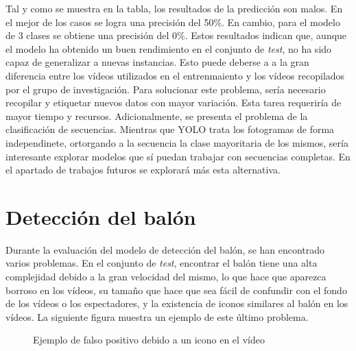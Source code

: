 \documentclass[12pt]{report} %
\begin{document}
    Tal y como se muestra en la tabla, los resultados de la predicción son
    malos. En el mejor de los casos se logra una precisión del 50\%. En cambio,
    para el modelo de 3 clases se obtiene una precisión del 0\%. Estos
    resultados indican que, aunque el modelo ha obtenido un buen rendimiento en
    el conjunto de \textit{test}, no ha sido capaz de generalizar a nuevas
    instancias. Esto puede deberse a a la gran diferencia entre los vídeos
    utilizados en el entrenmaiento y los vídeos recopilados por el grupo de
    investigación. Para solucionar este problema, sería necesario recopilar y
    etiquetar nuevos datos con mayor variación. Esta tarea requeriría de mayor
    tiempo y recursos. Adicionalmente, se presenta el problema de la
    clasificación de secuencias. Mientras que YOLO trata los fotogramas de
    forma independinete, ortorgando a la secuencia la clase mayoritaria de los
    mismos, sería interesante explorar modelos que sí puedan trabajar con
    secuencias completas. En el apartado de trabajos futuros se explorará más
    esta alternativa.

    \section{Detección del balón}

    Durante la evaluación del modelo de detección del balón, se han encontrado
    varios problemas. En el conjunto de \textit{test}, encontrar el balón tiene
    una alta complejidad debido a la gran velocidad del mismo, lo que hace que
    aparezca borroso en los vídeos, su tamaño que hace que sea fácil de
    confundir con el fondo de los vídeos o los espectadores, y la existencia de
    iconos similares al balón en los vídeos. La siguiente figura muestra un
    ejemplo de este último problema.

    \begin{figure}[H]
        \centering
        \caption{Ejemplo de falso positivo debido a un icono en el vídeo}
    \end{figure}
\end{document}
